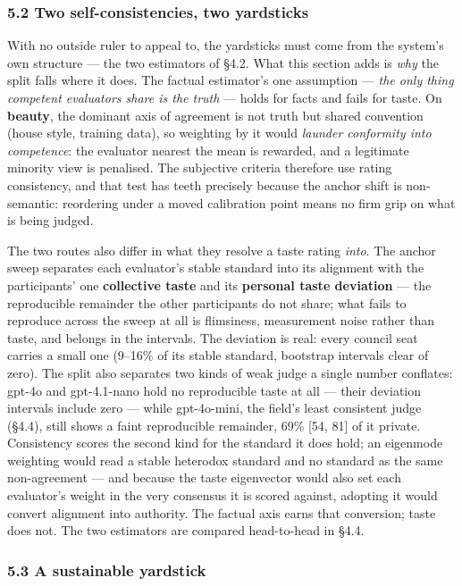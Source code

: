 \subsubsection{5.2 Two self-consistencies, two yardsticks}\label{two-self-consistencies-two-yardsticks}

With no outside ruler to appeal to, the yardsticks must come from the system's own structure --- the two estimators of §4.2. What this section adds is \emph{why} the split falls where it does. The factual estimator's one assumption --- \emph{the only thing competent evaluators share is the truth} --- holds for facts and fails for taste. On \textbf{beauty}, the dominant axis of agreement is not truth but shared convention (house style, training data), so weighting by it would \emph{launder conformity into competence}: the evaluator nearest the mean is rewarded, and a legitimate minority view is penalised. The subjective criteria therefore use rating consistency, and that test has teeth precisely because the anchor shift is non-semantic: reordering under a moved calibration point means no firm grip on what is being judged.

The two routes also differ in what they resolve a taste rating \emph{into}. The anchor sweep separates each evaluator's stable standard into its alignment with the participants' one \textbf{collective taste} and its \textbf{personal taste deviation} --- the reproducible remainder the other participants do not share; what fails to reproduce across the sweep at all is flimsiness, measurement noise rather than taste, and belongs in the intervals. The deviation is real: every council seat carries a small one (9--16\% of its stable standard, bootstrap intervals clear of zero). The split also separates two kinds of weak judge a single number conflates: gpt-4o and gpt-4.1-nano hold no reproducible taste at all --- their deviation intervals include zero --- while gpt-4o-mini, the field's least consistent judge (§4.4), still shows a faint reproducible remainder, 69\% {[}54, 81{]} of it private. Consistency scores the second kind for the standard it does hold; an eigenmode weighting would read a stable heterodox standard and no standard as the same non-agreement --- and because the taste eigenvector would also set each evaluator's weight in the very consensus it is scored against, adopting it would convert alignment into authority. The factual axis earns that conversion; taste does not. The two estimators are compared head-to-head in §4.4.

\subsubsection{5.3 A sustainable yardstick}\label{a-sustainable-yardstick}

